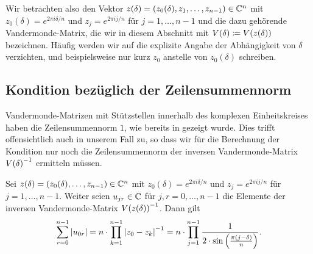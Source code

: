 Wir betrachten also den Vektor $z(\delta) = (z_0(\delta), z_1, \dots, z_{n-1}) \in \mathbb{C}^n$ mit
$z_0(\delta) = e^{2 \pi i \delta / n}$
und
$z_j = e^{2 \pi i j / n}$ für $j = 1, \dots, n-1$
und die dazu gehörende Vandermonde-Matrix, die wir in diesem Abschnitt
mit $V \! \left( \delta \right) \coloneqq V \! \left( z(\delta) \right)$ bezeichnen.
Häufig werden wir auf die explizite Angabe der Abhängigkeit von $\delta$
verzichten, und beispielsweise nur kurz $z_0$ anstelle von $z_0(\delta)$
schreiben.

\subsection{Kondition bezüglich der Zeilensummennorm}

Vandermonde-Matrizen mit Stützstellen innerhalb des komplexen Einheitskreises
haben die Zeilensummennorm $1$, wie bereits in
 gezeigt wurde.
Dies trifft offensichtlich auch in unserem Fall zu, so dass wir für die
Berechnung der Kondition nur noch die Zeilensummennorm der inversen
Vandermonde-Matrix $V \! \left( \delta \right)^{-1}$ ermitteln müssen.

\begin{lemma}
    \label{lemma:inverse_outlier_vandermonde_first_row_abs_sum}
    Sei $z(\delta) = (z_0(\delta), \dots, z_{n-1}) \in \mathbb{C}^n$ mit
    $z_0(\delta) = e^{2 \pi i \delta / n}$
    und
    $z_j = e^{2 \pi i j / n}$ für $j = 1, \dots, n-1$.
    Weiter seien $u_{jr} \in \mathbb{C}$ für $j,r = 0,\dots,n-1$ die Elemente der
    inversen Vandermonde-Matrix $V \! \left( z(\delta) \right)^{-1}$.
    Dann gilt
    \[
        \sum_{r=0}^{n-1} \left\lvert  u_{0r}  \right\rvert
        = n \cdot \prod_{k=1}^{n-1} \left\lvert z_0 - z_k \right\rvert^{-1}
        = n \cdot \prod_{j=1}^{n-1} \frac{1}{2 \cdot \sin \left(\frac{\pi (j - \delta)}{n} \right)}.
    \]
\end{lemma}

